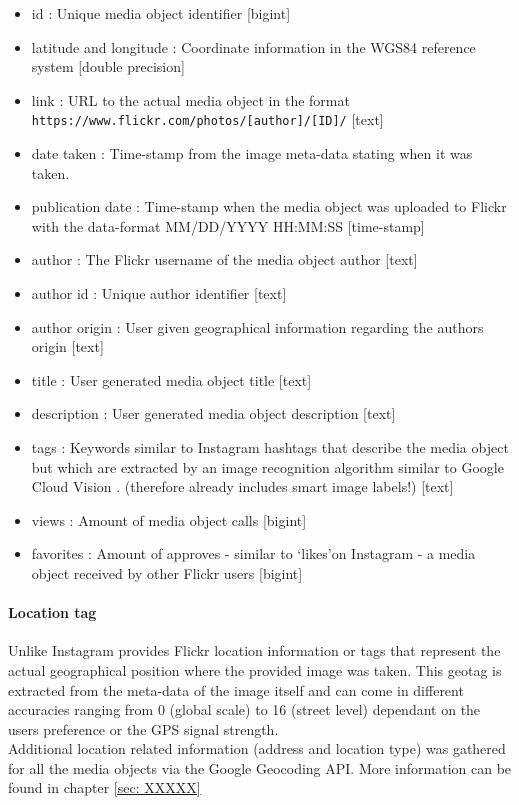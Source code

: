 \begin{itemize}
    \item id : Unique media object identifier [bigint]
    \item latitude and longitude : Coordinate information in the WGS84 reference system [double precision]
    \item link : URL to the actual media object in the format \texttt{https://www.flickr.com/photos/[author]/[ID]/} [text]
    \item date taken : Time-stamp from the image meta-data stating when it was taken. 
    \item publication date : Time-stamp when the media object was uploaded to Flickr with the data-format MM/DD/YYYY HH:MM:SS [time-stamp]
    \item author : The Flickr username of the media object author [text]
    \item author id : Unique author identifier [text] 
    \item author origin : User given geographical information regarding the authors origin [text]
    \item title : User generated media object title [text]
    \item description : User generated media object description [text]
    \item tags : Keywords similar to Instagram hashtags that describe the media object but which are extracted by an image recognition algorithm similar to Google Cloud Vision \cite{Flickr2019FlickrRecognition}. (therefore already includes smart image labels!) [text]
    \item views : Amount of media object calls [bigint]
    \item favorites : Amount of approves - similar to \lq likes\rq on Instagram - a media object received by other Flickr users [bigint]
\end{itemize}

\paragraph{Location tag}
Unlike Instagram provides Flickr location information or tags that represent the actual geographical position where the provided image was taken. This geotag is extracted from the meta-data of the image itself and can come in different accuracies ranging from 0 (global scale) to 16 (street level) dependant on the users preference or the GPS signal strength. \\
Additional location related information (address and location type) was gathered for all the media objects via the Google Geocoding API. More information can be found in chapter \ref{sec: XXXXX}

